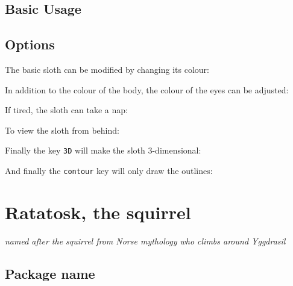\documentclass[parskip=half]{scrartcl}
\begin{document}
\subsection{Basic Usage}

\begin{tcblisting}{}
\sloth
\end{tcblisting}

\subsection{Options}

The basic sloth can be modified by changing its colour:
\begin{tcblisting}{}
\sloth[body=blue]
\end{tcblisting}

In addition to the colour of the body, the colour of the eyes can be adjusted:
\begin{tcblisting}{}
\sloth[eye=red]
\end{tcblisting}

If tired, the sloth can take a nap:
\begin{tcblisting}{}
\sloth[sleeping]
\end{tcblisting}

To view the sloth from behind:
\begin{tcblisting}{}
\sloth[back]
\end{tcblisting}

Finally the key \lstinline|3D| will make the sloth 3-dimensional:
\begin{tcblisting}{}
\sloth[3D]
\end{tcblisting}

And finally the \lstinline|contour| key will only draw the outlines:
\begin{tcblisting}{}
\sloth[contour=black]
\end{tcblisting}

%
%
\clearpage
\section[Squirrel]{Ratatosk, the squirrel}

\emph{named after the squirrel from Norse mythology who climbs around Yggdrasil}

\subsection{Package name}
\end{document}
